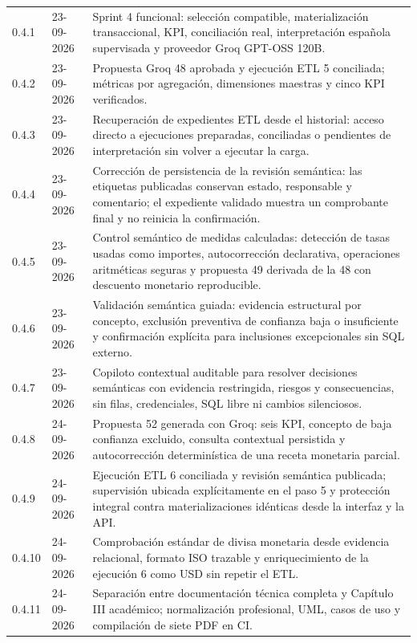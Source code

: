 \documentclass[11pt,letterpaper]{article}
\begin{document}
\begin{longtable}{@{}p{0.82in}@{\hspace{0.16in}}p{0.98in}@{\hspace{0.16in}}p{4.36in}@{}}
  0.4.1 & 23-09-2026 & Sprint 4 funcional: selección compatible, materialización transaccional, KPI, conciliación real, interpretación española supervisada y proveedor Groq GPT-OSS 120B. \\
  0.4.2 & 23-09-2026 & Propuesta Groq 48 aprobada y ejecución ETL 5 conciliada; métricas por agregación, dimensiones maestras y cinco KPI verificados. \\
  0.4.3 & 23-09-2026 & Recuperación de expedientes ETL desde el historial: acceso directo a ejecuciones preparadas, conciliadas o pendientes de interpretación sin volver a ejecutar la carga. \\
  0.4.4 & 23-09-2026 & Corrección de persistencia de la revisión semántica: las etiquetas publicadas conservan estado, responsable y comentario; el expediente validado muestra un comprobante final y no reinicia la confirmación. \\
  0.4.5 & 23-09-2026 & Control semántico de medidas calculadas: detección de tasas usadas como importes, autocorrección declarativa, operaciones aritméticas seguras y propuesta 49 derivada de la 48 con descuento monetario reproducible. \\
  0.4.6 & 23-09-2026 & Validación semántica guiada: evidencia estructural por concepto, exclusión preventiva de confianza baja o insuficiente y confirmación explícita para inclusiones excepcionales sin SQL externo. \\
  0.4.7 & 23-09-2026 & Copiloto contextual auditable para resolver decisiones semánticas con evidencia restringida, riesgos y consecuencias, sin filas, credenciales, SQL libre ni cambios silenciosos. \\
  0.4.8 & 24-09-2026 & Propuesta 52 generada con Groq: seis KPI, concepto de baja confianza excluido, consulta contextual persistida y autocorrección determinística de una receta monetaria parcial. \\
  0.4.9 & 24-09-2026 & Ejecución ETL 6 conciliada y revisión semántica publicada; supervisión ubicada explícitamente en el paso 5 y protección integral contra materializaciones idénticas desde la interfaz y la API. \\
  0.4.10 & 24-09-2026 & Comprobación estándar de divisa monetaria desde evidencia relacional, formato ISO trazable y enriquecimiento de la ejecución 6 como USD sin repetir el ETL. \\
  0.4.11 & 24-09-2026 & Separación entre documentación técnica completa y Capítulo III académico; normalización profesional, UML, casos de uso y compilación de siete PDF en CI. \\

\end{longtable}
\end{document}
